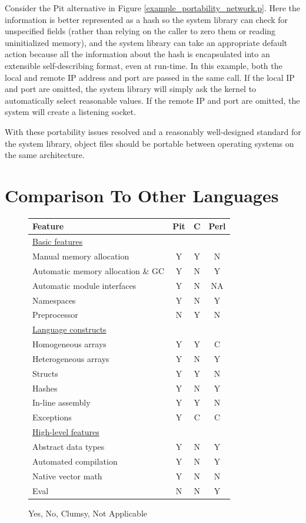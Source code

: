 Consider the Pit alternative in Figure
\ref{example_portability_network.p}.  Here the information is better represented as a hash so the system library can
check for unspecified fields (rather than relying on the caller to zero them or reading uninitialized memory), and the
system library can take an appropriate default action because all the information about the hash is encapsulated into
an extensible self-describing format, even at run-time.  In this example, both the
local and remote IP address and port are passed in the same call.  If the local IP and port are omitted, the system
library will simply ask the kernel to automatically select reasonable values.  If the remote IP and port are omitted,
the system will create a listening socket.

With these portability issues resolved and a reasonably well-designed standard for the system library, object files
should be portable between operating systems on the same architecture.


\section{Comparison To Other Languages}

\begin{figure}[htb]
\begin{tabular}{ | l || c | c | c | }
\hline
\bf{Feature}						& \bf{Pit} & \bf{C} & \bf{Perl} \\
\hline

\underline{Basic features} \\
\hline
Manual memory allocation				& Y & Y & N \\
\hline
Automatic memory allocation \& GC			& Y & N & Y \\
\hline
Automatic module interfaces				& Y & N & NA \\
\hline
Namespaces						& Y & N & Y \\
\hline
Preprocessor						& N & Y & N \\
\hline

\underline{Language constructs} \\
\hline
Homogeneous arrays					& Y & Y & C \\
\hline
Heterogeneous arrays					& Y & N & Y \\
\hline
Structs							& Y & Y & N \\
\hline
Hashes							& Y & N & Y \\
\hline
In-line assembly						& Y & Y & N \\
\hline
Exceptions						& Y & C & C \\
\hline

\underline{High-level features} \\
\hline
Abstract data types					& Y & N & Y \\
\hline
Automated compilation					& Y & N & Y \\
\hline
Native vector math					& Y & N & N \\
\hline
Eval							& N & N & Y \\
\hline
\end{tabular}

Yes, No, Clumsy, Not Applicable
\end{figure}

